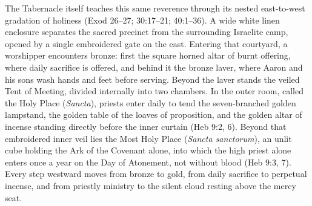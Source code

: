 The Tabernacle itself teaches this same reverence through its nested east-to-west gradation of holiness (Exod 26--27; 30:17--21; 40:1--36). A wide white linen enclosure separates the sacred precinct from the surrounding Israelite camp, opened by a single embroidered gate on the east. Entering that courtyard, a worshipper encounters bronze: first the square horned altar of burnt offering, where daily sacrifice is offered, and behind it the bronze laver, where Aaron and his sons wash hands and feet before serving. Beyond the laver stands the veiled Tent of Meeting, divided internally into two chambers. In the outer room, called the Holy Place (\textit{Sancta}), priests enter daily to tend the seven-branched golden lampstand, the golden table of the loaves of proposition, and the golden altar of incense standing directly before the inner curtain (Heb 9:2, 6). Beyond that embroidered inner veil lies the Most Holy Place (\textit{Sancta sanctorum}), an unlit cube holding the Ark of the Covenant alone, into which the high priest alone enters once a year on the Day of Atonement, not without blood (Heb 9:3, 7). Every step westward moves from bronze to gold, from daily sacrifice to perpetual incense, and from priestly ministry to the silent cloud resting above the mercy seat.

